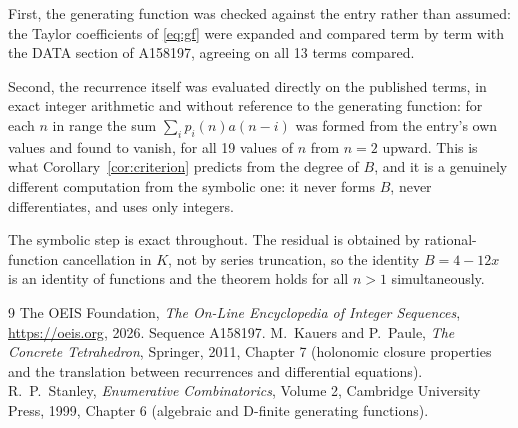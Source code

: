 \documentclass[11pt,a4paper]{article}
\theoremstyle{plain}
\theoremstyle{definition}
\begin{document}
First, the generating function was checked against the entry rather than assumed: the
Taylor coefficients of \eqref{eq:gf} were expanded and compared term by term with the DATA
section of A158197, agreeing on all 13 terms compared.

Second, the recurrence itself was evaluated directly on the published terms, in exact
integer arithmetic and without reference to the generating function: for each $n$ in range
the sum $\sum_{i}p_{i}(n)a(n-i)$ was formed from the entry's own values and found to
vanish, for all 19 values of $n$ from $n=2$ upward. This is what
Corollary~\ref{cor:criterion} predicts from the degree of $B$, and it is a genuinely
different computation from the symbolic one: it never forms $B$, never differentiates, and
uses only integers.

The symbolic step is exact throughout. The residual is obtained by rational-function
cancellation in $K$, not by series truncation, so the identity $B=4 - 12 x$ is an
identity of functions and the theorem holds for all $n>1$ simultaneously.

\begin{thebibliography}{9}
 The OEIS Foundation, \emph{The On-Line Encyclopedia of Integer Sequences},
\url{https://oeis.org}, 2026. Sequence A158197.
 M.~Kauers and P.~Paule, \emph{The Concrete Tetrahedron}, Springer, 2011,
Chapter 7 (holonomic closure properties and the translation between recurrences and
differential equations).
 R.~P.~Stanley, \emph{Enumerative Combinatorics}, Volume 2, Cambridge
University Press, 1999, Chapter 6 (algebraic and D-finite generating functions).
\end{thebibliography}
\end{document}
